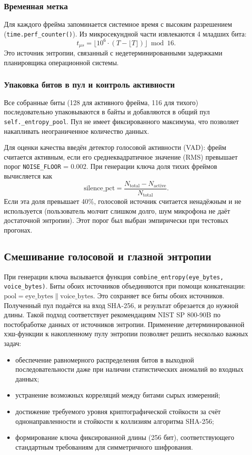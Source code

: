 \documentclass[14pt, a4paper]{extreport}
\begin{document}
\subsubsection{Временная метка}

Для каждого фрейма запоминается системное время с высоким разрешением (\texttt{time.perf\_counter()}). Из микросекундной части извлекаются 4 младших бита:
\[
t_{\mu s} = \bigl\lfloor 10^6 \cdot (T - \lfloor T \rfloor) \bigr\rfloor \bmod 16.
\]
Это источник энтропии, связанный с недетерминированными задержками планировщика операционной системы.

\subsubsection{Упаковка битов в пул и контроль активности}

Все собранные биты (128 для активного фрейма, 116 для тихого) последовательно упаковываются в байты и добавляются в общий пул \texttt{self.\_entropy\_pool}. Пул не имеет фиксированного максимума, что позволяет накапливать неограниченное количество данных.

Для оценки качества введён детектор голосовой активности (VAD): фрейм считается активным, если его среднеквадратичное значение (RMS) превышает порог \texttt{NOISE\_FLOOR} = 0.002. При генерации ключа доля тихих фреймов вычисляется как
\[
\mathrm{silence\_pct} = \frac{N_{\mathrm{total}} - N_{\mathrm{active}}}{N_{\mathrm{total}}}.
\]
Если эта доля превышает 40\%, голосовой источник считается ненадёжным и не используется (пользователь молчит слишком долго, шум микрофона не даёт достаточной энтропии). Этот порог был выбран эмпирически при тестовых прогонах.

\subsection{Смешивание голосовой и глазной энтропии}

При генерации ключа вызывается функция \texttt{combine\_entropy(eye\_bytes, voice\_bytes)}. 
Биты обоих источников объединяются при помощи конкатенации: $\mathrm{pool} = \mathrm{eye\_bytes} \parallel \mathrm{voice\_bytes}$.
Это сохраняет все биты обоих источников. Полученный пул подаётся на вход SHA-256, и результат обрезается до нужной длины. Такой подход соответствует рекомендациям NIST SP 800-90B по постобработке данных от источников энтропии.
Применение детерминированной хэш-функции к накопленному пулу энтропии позволяет решить несколько важных задач:
\begin{itemize}
    \item обеспечение равномерного распределения битов в выходной последовательности даже при наличии статистических аномалий во входных данных;
    \item устранение возможных корреляций между битами сырых измерений;
    \item достижение требуемого уровня криптографической стойкости за счёт однонаправленности и стойкости к коллизиям алгоритма SHA-256;
    \item формирование ключа фиксированной длины (256 бит), соответствующего стандартным требованиям для симметричного шифрования.
\end{itemize}
\end{document}
